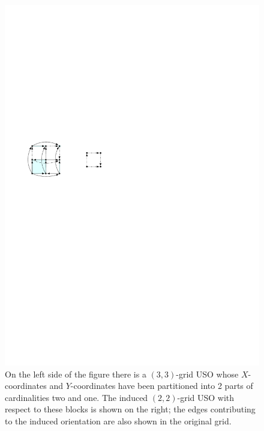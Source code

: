 \documentclass[runningheads,a4paper]{llncs}
\begin{document}
  \begin{figure}[htbp] 
  	\centering
  	\includegraphics[scale=1]{induced_orientation_ex.pdf}
  	\caption{\small On the left side of the figure there is a $(3,3)$-grid USO whose $X$-coordinates and $Y$-coordinates have been partitioned into 2 parts of cardinalities two and one. The induced $(2,2)$-grid USO with respect to these blocks is shown on the right; the edges contributing to the induced orientation are also shown in the original grid.} 
  	\label{fig:example_induced_orientation}
  \end{figure}
\end{document}
